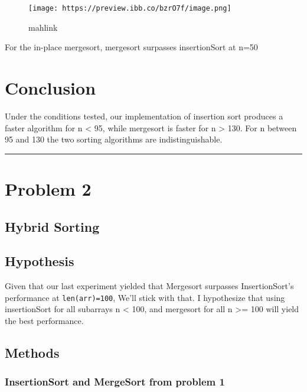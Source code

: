 \documentclass[11pt]{article}
\makeatletter
\def\maxwidth{\ifdim\Gin@nat@width>\linewidth\linewidth
    \else\Gin@nat@width\fi}
\let\Oldincludegraphics\includegraphics
\renewcommand{\includegraphics}[1]{\Oldincludegraphics[width=.8\maxwidth]{#1}}
\makeatother
\begin{document}
    \begin{figure}
\centering
\texttt{[image: https://preview.ibb.co/bzrO7f/image.png]}
\caption{mahlink}
\end{figure}

For the in-place mergesort, mergesort surpasses insertionSort at n=50

    \section{Conclusion}\label{conclusion}

Under the conditions tested, our implementation of insertion sort
produces a faster algorithm for n \textless{} 95, while mergesort is
faster for n \textgreater{} 130. For n between 95 and 130 the two
sorting algorithms are indistinguishable.

    \begin{center}\rule{0.5\linewidth}{\linethickness}\end{center}

\section{Problem 2}\label{problem-2}

\subsection{Hybrid Sorting}\label{hybrid-sorting}

    \subsection{Hypothesis}\label{hypothesis}

Given that our last experiment yielded that Mergesort surpasses
InsertionSort's performance at \texttt{len(arr)=100}, We'll stick with
that. I hypothesize that using insertionSort for all subarrays n
\textless{} 100, and mergesort for all n \textgreater{}= 100 will yield
the best performance.

    \subsection{Methods}\label{methods}

\subsubsection{InsertionSort and MergeSort from problem
1}\label{insertionsort-and-mergesort-from-problem-1}
\end{document}
